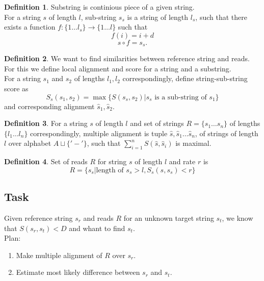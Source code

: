 \documentclass[a4paper, 12pt]{article}
\theoremstyle{definition}
\newtheorem{definition}{Definition}[section]
\theoremstyle{definition}
\theoremstyle{remark}
\begin{document}
\begin{definition}
    Substring is continious piece of a given string.\\
    For a string $s$ of length $l$, sub-string $s_s$ 
    is a string of length $l_s$, such that there exists a function
    $f: \{ 1 \ldots l_s \} \rightarrow \{ 1 \ldots l\}$
    such that
    $$ f(i) = i + d $$
    $$s \circ f = s_s.$$
\end{definition}

\begin{definition}
    We want to find similarities between reference string and reads. 
    For this we define local alignment and score for a string and a substring. \\  
    For a string $s_1$ and $s_2$ of lengths $l_1, l_2$ correspondingly, define string-sub-string score as 
    $$ S_s (s_1, s_2) = \max \{ S(s_s, s_2) | s_s \text{ is a sub-string of } s_1 \}$$
    and corresponding alignment $\hat{s}_1, \hat{s}_2$.
\end{definition}

\begin{definition}
    For a string $s$ of length $l$ and set of strings $R = \{ s_1 \ldots s_n \}$ 
    of lengths $\{ l_1 \ldots l_n \}$ correspondingly, 
    multiple alignment is tuple $\hat{s}, \hat{s}_1 \ldots \hat{s}_n$, 
    of strings of length $l$ over alphabet $A \sqcup \{ '-' \}$, such that $\sum_{i = 1}^n S(\hat{s}, \hat{s}_i)$ is maximal.
\end{definition}

\begin{definition}
    Set of reads $R$ for string $s$ of length $l$ and rate $r$ is 
    $$ R = \{ s_s | \text{length of } s_s > l, S_s(s, s_s) < r \}$$
\end{definition}

\subsection{Task}
Given reference string $s_r$ and reads $R$ for an unknown target string $s_t$, 
we know that $S(s_r, s_t) < D$ and whant to find $s_t$. \\

Plan:
\begin{enumerate}
    \item Make multiple alignment of $R$ over $s_r$.
    \item Estimate most likely difference between $s_r$ and $s_t$.
\end{enumerate}
\end{document}
